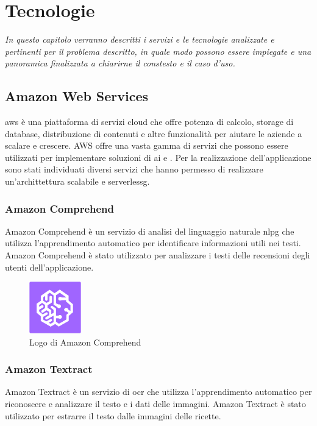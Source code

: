 \chapter{Tecnologie}
\label{cap:tecnologie}
\emph{In questo capitolo verranno descritti i servizi e le tecnologie analizzate e pertinenti per il problema descritto, in quale modo possono essere impiegate e una panoramica finalizzata a chiarirne il constesto e il caso d'uso.}

\section{Amazon Web Services}
\gls{aws} è una piattaforma di servizi cloud che offre potenza di calcolo, storage di database, distribuzione di contenuti e altre funzionalità per aiutare le aziende a scalare e crescere. AWS offre una vasta gamma di servizi che possono essere utilizzati per implementare soluzioni di \gls{ai} e . Per la realizzazione dell'applicazione sono stati individuati diversi servizi che hanno permesso di realizzare un'archittettura scalabile e \gls{serverlessg}.

\subsection{Amazon Comprehend}
Amazon Comprehend è un servizio di analisi del linguaggio naturale \gls{nlpg} che utilizza l'apprendimento automatico per identificare informazioni utili nei testi. Amazon Comprehend è stato utilizzato per analizzare i testi delle recensioni degli utenti dell'applicazione.

\begin{figure}[h]
  \centering
  \includegraphics[width=0.2\textwidth]{img/tecnologie/comprehend.png}
  \caption{Logo di Amazon Comprehend}
  \label{fig:comprehend}
\end{figure}

\subsection{Amazon Textract}
Amazon Textract è un servizio di \gls{ocr} che utilizza l'apprendimento automatico per riconoscere e analizzare il testo e i dati delle immagini. Amazon Textract è stato utilizzato per estrarre il testo dalle immagini delle ricette.

